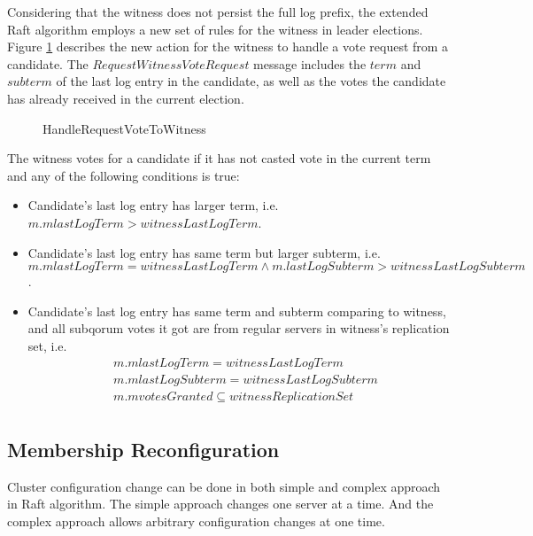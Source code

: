 Considering that the witness does not persist the full log prefix, the extended Raft algorithm employs a new set of rules for the witness in leader elections. Figure \ref{fig:handle-request-witness-vote} describes the new action for the witness to handle a vote request from a candidate. The $RequestWitnessVoteRequest$ message includes the $term$ and $subterm$ of the last log entry in the candidate, as well as the votes the candidate has already received in the current election.
\begin{figure}
    \begin{framed}
        
    \end{framed}
    \caption{HandleRequestVoteToWitness}
    \label{fig:handle-request-witness-vote}
\end{figure}
The witness votes for a candidate if it has not casted vote in the current term and any of the following conditions is true:
\begin{itemize}
    \item Candidate's last log entry has larger term, i.e. $m.mlastLogTerm > witnessLastLogTerm$.
    \item Candidate's last log entry has same term but larger subterm, i.e. $m.mlastLogTerm = witnessLastLogTerm \land m.lastLogSubterm > witnessLastLogSubterm$.
    \item Candidate's last log entry has same term and subterm comparing to witness, and all subqorum votes it got are from regular servers in witness's replication set, i.e.
          \begin{displaymath}
              \begin{aligned}
                   & m.mlastLogTerm = witnessLastLogTerm             \\
                   & m.mlastLogSubterm = witnessLastLogSubterm       \\
                   & m.mvotesGranted \subseteq witnessReplicationSet \\
              \end{aligned}
          \end{displaymath}
\end{itemize}


\subsection{Membership Reconfiguration}
Cluster configuration change can be done in both simple and complex approach in Raft algorithm. The simple approach changes one server at a time. And the complex approach allows arbitrary configuration changes at one time. 

